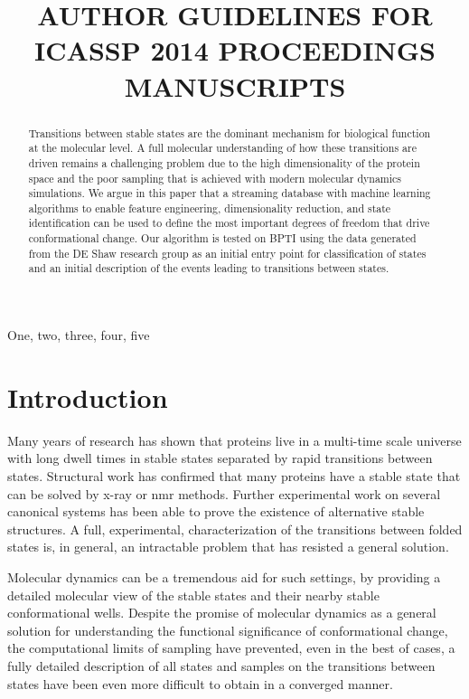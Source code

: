 \documentclass{article}
\title{AUTHOR GUIDELINES FOR ICASSP 2014 PROCEEDINGS MANUSCRIPTS}
\begin{document}
%
\maketitle
%
\begin{abstract}
Transitions between stable states are the dominant mechanism for biological function
at the molecular level.  A full molecular understanding of how these transitions are
driven remains a challenging problem due to the high dimensionality of the protein
space and the poor sampling that is achieved with modern molecular dynamics simulations.
We argue in this paper that a streaming database with machine learning algorithms
to enable feature engineering, dimensionality reduction, and state identification can
be used to define the most important degrees of freedom that drive conformational
change. Our algorithm is tested on BPTI using the data generated from the DE Shaw
research group as an initial entry point for classification of states and an initial
description of the events leading to transitions between states.
\end{abstract}
%
\begin{keywords}
One, two, three, four, five
\end{keywords}
%
\section{Introduction}
\label{sec:intro}

Many years of research has shown that proteins live in a multi-time scale universe
with long dwell times in stable states separated by rapid transitions between states.
Structural work has confirmed that many proteins have a stable state that can be
solved by x-ray or nmr methods.  Further experimental work on several canonical
systems has been able to prove the existence of alternative stable structures.  A
full, experimental, characterization of the transitions between folded states is,
in general, an intractable problem that has resisted a general solution.

Molecular dynamics can be a tremendous aid for such settings, by providing
a detailed molecular view of the stable states and their nearby stable conformational
wells.  Despite the promise of molecular dynamics as a general solution for understanding
the functional significance of conformational change, the computational limits of
sampling have prevented, even in the best of cases, a fully detailed description of
all states and samples on the transitions between states have been even more
difficult to obtain in a converged manner.  
\end{document}
